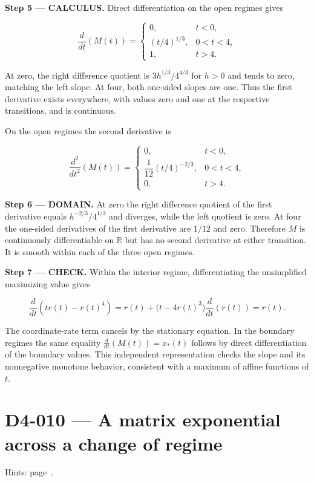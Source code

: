 \documentclass[11pt,oneside,openany]{book}
\begin{document}
\endgroup
\textbf{Step 5 --- CALCULUS.} Direct differentiation on the open regimes gives

\[
\frac{d}{dt}\left(M(t)\right)=
\begin{cases}
0,&t<0,\\
(t/4)^{1/3},&0<t<4,\\
1,&t>4.
\end{cases}
\]

At zero, the right difference quotient is \(3h^{1/3}/4^{4/3}\) for \(h>0\) and tends to zero, matching the left slope. At four, both one-sided slopes are one. Thus the first derivative exists everywhere, with values zero and one at the respective transitions, and is continuous.

On the open regimes the second derivative is

\[
\frac{d^2}{dt^2}\left(M(t)\right)=
\begin{cases}
0,&t<0,\\
\dfrac1{12}(t/4)^{-2/3},&0<t<4,\\
0,&t>4.
\end{cases}
\]

\begin{DomainStep}
\textbf{Step 6 --- DOMAIN.} At zero the right difference quotient of the first derivative equals \(h^{-2/3}/4^{1/3}\) and diverges, while the left quotient is zero. At four the one-sided derivatives of the first derivative are \(1/12\) and zero. Therefore \(M\) is continuously differentiable on \(\mathbb R\) but has no second derivative at either transition. It is smooth within each of the three open regimes.

\end{DomainStep}
\textbf{Step 7 --- CHECK.} Within the interior regime, differentiating the unsimplified maximizing value gives

\[
\frac{d}{dt}\left(tr(t)-r(t)^4\right)
=r(t)+\bigl(t-4r(t)^3\bigr)\frac{d}{dt}\left(r(t)\right)=r(t).
\]

The coordinate-rate term cancels by the stationary equation. In the boundary regimes the same equality \(\frac{d}{dt}(M(t))=x_*(t)\) follows by direct differentiation of the boundary values. This independent representation checks the slope and its nonnegative monotone behavior, consistent with a maximum of affine functions of \(t\).
\clearpage
\section{D4-010 --- A matrix exponential across a change of regime}
\label{problem:D4-010}
{\small Hints: page~\pageref{hints:D4-010}.}\par\medskip
\end{document}
